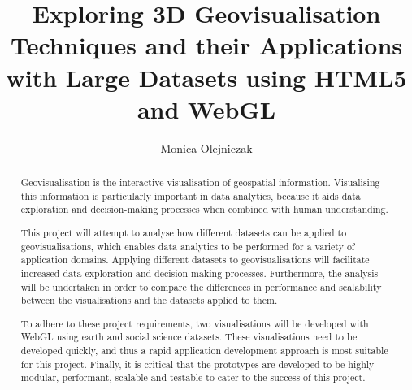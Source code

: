 \documentclass[
	fontsize=11pt
	headlines=2,
	footlines=2,
	parskip=half
]{scrartcl}
\title{Exploring 3D Geovisualisation Techniques and their Applications with Large Datasets using HTML5 and WebGL}
\author{Monica Olejniczak}
\begin{document}
	\makeatletter
		\textbf{\LARGE\textsf{\@title}}
		\vspace{-8pt}
		\begin{center}
			\large\textbf{\textsf{\@author}}
		\end{center}
		\vspace{-24pt}
	\makeatother

	\begin{abstract}
		Geovisualisation is the interactive visualisation of geospatial information. Visualising this information is particularly important in data analytics, because it aids data exploration and decision-making processes when combined with human understanding.

		This project will attempt to analyse how different datasets can be applied to geovisualisations, which enables data analytics to be performed for a variety of application domains. Applying different datasets to geovisualisations will facilitate increased data exploration and decision-making processes. Furthermore, the analysis will be undertaken in order to compare the differences in performance and scalability between the visualisations and the datasets applied to them.

		To adhere to these project requirements, two visualisations will be developed with WebGL using earth and social science datasets. These visualisations need to be developed quickly, and thus a rapid application development approach is most suitable for this project. Finally, it is critical that the prototypes are developed to be highly modular, performant, scalable and testable to cater to the success of this project.
	\end{abstract}
	
\end{document}
